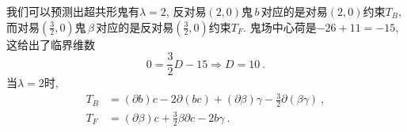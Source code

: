 我们可以预测出超共形鬼有$\lambda=2$, 反对易$(2,0)$鬼$\,b\,$对应的是对易$(2,0)$约束$T_{B}$, 而对易$(\frac{3}{2},0)$鬼$\,\beta\,$对应的是反对易$(\frac{3}{2},0)$约束$T_{F}$. 鬼场中心荷是$-26+11=-15$, 这给出了临界维数
\begin{equation}
    0=\frac{3}{2}D-15 \Rightarrow D=10\:.\label{10.1.20}
\end{equation}
当$\lambda=2$时,
\begin{subequations}
\begin{align}
    T_{B}&=(\partial b)c-2\partial(bc)+(\partial \beta)\gamma-\frac{3}{2}\partial(\beta\gamma)\:,
    \label{10.1.21a} \\
    T_{F}&=(\partial \beta)c+ \frac{3}{2}\beta\partial c - 2b\gamma\:.\label{10.1.21b}
\end{align}
\end{subequations}
 
